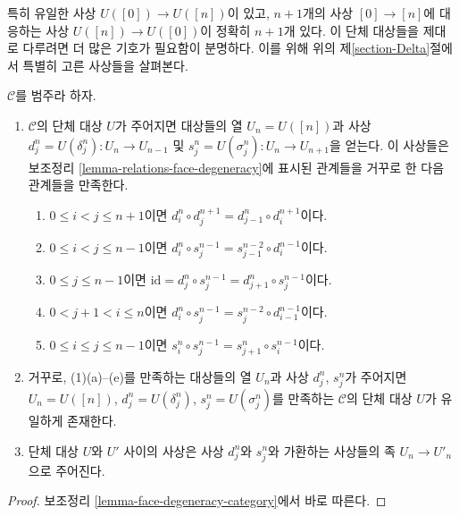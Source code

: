 \medskip\noindent
특히 유일한 사상 $U([0]) \to U([n])$이 있고,
$n + 1$개의 사상 $[0] \to [n]$에 대응하는 사상
$U([n]) \to U([0])$이 정확히 $n + 1$개 있다.
이 단체 대상들을 제대로 다루려면 더 많은 기호가 필요함이 분명하다.
이를 위해 위의 제\ref{section-Delta}절에서 특별히 고른 사상들을 살펴본다.

\begin{lemma}
\label{lemma-characterize-simplicial-object}
$\mathcal{C}$를 범주라 하자.
\begin{enumerate}
\item $\mathcal{C}$의 단체 대상 $U$가 주어지면 대상들의 열
$U_n = U([n])$과 사상
$d^n_j = U(\delta^n_j) : U_n \to U_{n-1}$ 및
$s^n_j = U(\sigma^n_j) : U_n \to U_{n + 1}$을 얻는다.
이 사상들은 보조정리 \ref{lemma-relations-face-degeneracy}에 표시된
관계들을 거꾸로 한 다음 관계들을 만족한다.
\begin{enumerate}
\item $0 \leq i < j \leq n + 1$이면
$d^n_i \circ d^{n + 1}_j = d^n_{j - 1} \circ d^{n + 1}_i$이다.
\item $0 \leq i < j \leq n - 1$이면
$d^n_i \circ s^{n - 1}_j = s^{n - 2}_{j - 1} \circ d^{n - 1}_i$이다.
\item $0 \leq j \leq n - 1$이면
$\text{id} = d^n_j \circ s^{n - 1}_j = d^n_{j + 1} \circ s^{n - 1}_j$이다.
\item $0 < j + 1 < i \leq n$이면
$d^n_i \circ s^{n - 1}_j = s^{n - 2}_j \circ d^{n - 1}_{i - 1}$이다.
\item $0 \leq i \leq j \leq n - 1$이면
$s^n_i \circ s^{n - 1}_j = s^n_{j + 1} \circ s^{n - 1}_i$이다.
\end{enumerate}
\item 거꾸로, (1)(a)--(e)를 만족하는 대상들의 열 $U_n$과 사상
$d^n_j$, $s^n_j$가 주어지면
$U_n = U([n])$, $d^n_j = U(\delta^n_j)$,
$s^n_j = U(\sigma^n_j)$를 만족하는 $\mathcal{C}$의 단체 대상 $U$가
유일하게 존재한다.
\item 단체 대상 $U$와 $U'$ 사이의 사상은 사상 $d^n_j$와 $s^n_j$와
가환하는 사상들의 족 $U_n \to U'_n$으로 주어진다.
\end{enumerate}
\end{lemma}

\begin{proof}
보조정리 \ref{lemma-face-degeneracy-category}에서 바로 따른다.
\end{proof}

